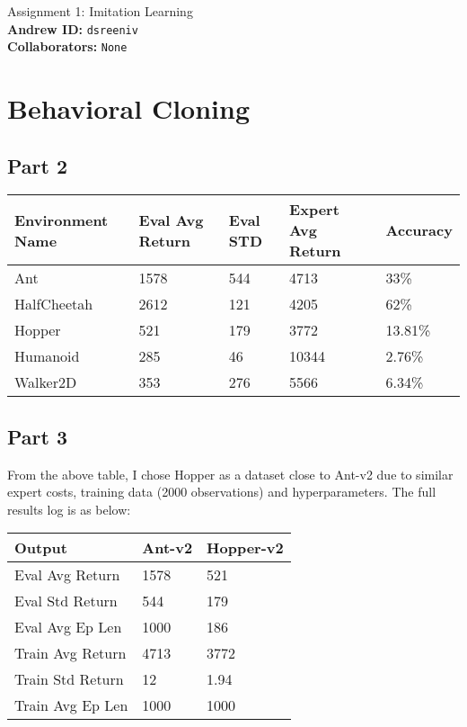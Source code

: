 \documentclass{article}
\begin{document}

\begin{centering}
    {\Large Assignment 1: Imitation Learning} \\
    \vspace{.25cm}
    \textbf{Andrew ID:} \texttt{dsreeniv} \\
    \textbf{Collaborators:} \texttt{None}\\ 
\end{centering}

\vspace{.5cm}

\section{Behavioral Cloning}
\subsection{Part 2}
\begin{center}
\begin{table}[h]
\begin{tabular}{|l|l|l|l|l|}
\hline
 \textbf{Environment Name} & \textbf{Eval Avg Return} & \textbf{Eval STD} & \textbf{Expert Avg Return} & \textbf{Accuracy} \\
 \hline
 Ant & 1578 & 544 & 4713 & 33\% \\
 HalfCheetah & 2612 & 121 & 4205 & 62\% \\
 Hopper & 521 & 179 & 3772 & 13.81\%\\
 Humanoid & 285 & 46 & 10344 & 2.76\%\\
 Walker2D & 353 & 276 & 5566 & 6.34\% \\
 \hline
\end{tabular}
\end{table}
\end{center}

\subsection{Part 3}
From the above table, I chose Hopper as a dataset close to Ant-v2 due to similar expert costs, training data (2000 observations) and hyperparameters. The full results log is as below:

\begin{center}
\begin{table}[h]
\begin{tabular}{|l|l|l|}
\hline
 \textbf{Output} & \textbf{Ant-v2} & \textbf{Hopper-v2}  \\
 \hline
 Eval Avg Return & 1578 & 521 \\
 Eval Std Return & 544 & 179 \\
 Eval Avg Ep Len & 1000 & 186 \\
 Train Avg Return & 4713 & 3772 \\
 Train Std Return & 12 & 1.94 \\
 Train Avg Ep Len & 1000 & 1000 \\
 \hline
\end{tabular}
\end{table}
\end{center}
\end{document}
